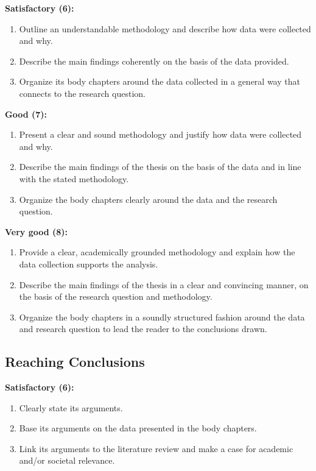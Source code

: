 \documentclass[11pt,a4paper]{article}
\begin{document}
\textbf{Satisfactory (6):}
\begin{enumerate}[label=\Alph*.]
    \item Outline an understandable methodology and describe how data were collected and why.
    \item Describe the main findings coherently on the basis of the data provided.
    \item Organize its body chapters around the data collected in a general way that connects to the research question.
\end{enumerate}

\textbf{Good (7):}
\begin{enumerate}[label=\Alph*.]
    \item Present a clear and sound methodology and justify how data were collected and why.
    \item Describe the main findings of the thesis on the basis of the data and in line with the stated methodology.
    \item Organize the body chapters clearly around the data and the research question.
\end{enumerate}

\textbf{Very good (8):}
\begin{enumerate}[label=\Alph*.]
    \item Provide a clear, academically grounded methodology and explain how the data collection supports the analysis.
    \item Describe the main findings of the thesis in a clear and convincing manner, on the basis of the research question and methodology.
    \item Organize the body chapters in a soundly structured fashion around the data and research question to lead the reader to the conclusions drawn.
\end{enumerate}

\subsection{Reaching Conclusions}

\textbf{Satisfactory (6):}
\begin{enumerate}[label=\Alph*.]
    \item Clearly state its arguments.
    \item Base its arguments on the data presented in the body chapters.
    \item Link its arguments to the literature review and make a case for academic and/or societal relevance.
\end{enumerate}
\end{document}
